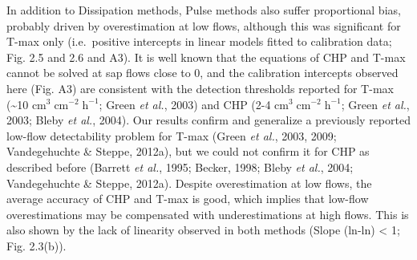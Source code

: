 \documentclass[11pt,twoside]{reedthesis}
\begin{document}
In addition to Dissipation methods, Pulse methods also suffer
proportional bias, probably driven by overestimation at low flows,
although this was significant for T-max only (i.e.~positive intercepts
in linear models fitted to calibration data; Fig. 2.5 and 2.6 and A3).
It is well known that the equations of CHP and T-max cannot be solved at
sap flows close to 0, and the calibration intercepts observed here (Fig.
A3) are consistent with the detection thresholds reported for T-max
(\textasciitilde{}10 \(\text{cm}^3\; \text{cm}^{-2}\; \text{h}^{-1}\);
Green \emph{et al.}, 2003) and CHP (2-4
\(\text{cm}^3\; \text{cm}^{-2}\; \text{h}^{-1}\); Green \emph{et al.},
2003; Bleby \emph{et al.}, 2004). Our results confirm and generalize a
previously reported low-flow detectability problem for T-max (Green
\emph{et al.}, 2003, 2009; Vandegehuchte \& Steppe, 2012a), but we could
not confirm it for CHP as described before (Barrett \emph{et al.}, 1995;
Becker, 1998; Bleby \emph{et al.}, 2004; Vandegehuchte \& Steppe,
2012a). Despite overestimation at low flows, the average accuracy of CHP
and T-max is good, which implies that low-flow overestimations may be
compensated with underestimations at high flows. This is also shown by
the lack of linearity observed in both methods (Slope (ln-ln)
\textless{} 1; Fig. 2.3(b)).\par
\end{document}

